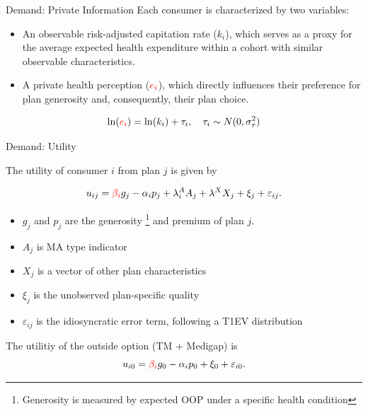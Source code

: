\documentclass[professionalfonts, aspectratio=169]{beamer}
\begin{document}
\begin{frame}{Demand: Private Information}
  Each consumer is characterized by two variables:
  \begin{itemize}
      \item An observable risk-adjusted capitation rate ($k_i$), which serves as a proxy for the average expected health expenditure within a cohort with similar observable characteristics.
      \item A private health perception ($\textcolor{red}{e_i}$), which directly influences their preference for plan generosity and, consequently, their plan choice.
  \end{itemize}

  \begin{equation}
    \ln(\textcolor{red}{e_i}) = \ln(k_i) + \tau_i, \quad \tau_i \sim N(0, \sigma_\tau^2)
  \end{equation}

\end{frame}

\begin{frame}{Demand: Utility}

  The utility of consumer $i$ from plan $j$ is given by

  \begin{equation}
    u_{ij} = \textcolor{red}{\beta_i} g_j - \alpha_i p_j + \lambda^{A}_i A_j + \lambda^X X_j + \xi_j + \varepsilon_{ij}.
  \end{equation}

  \begin{itemize}\small
    \item $g_j$ and $p_j$ are the generosity \footnote{Generosity is measured by expected OOP under a specific health condition} and premium of plan $j$.
    \item $A_j$ is MA type indicator
    \item $X_j$ is a vector of other plan characteristics
    \item $\xi_j$ is the unobserved plan-specific quality
    \item $\varepsilon_{ij}$ is the idiosyncratic error term, following a T1EV distribution
  \end{itemize}

  The utilitiy of the outside option (TM + Medigap) is
  \begin{equation}
    u_{i0} = \textcolor{red}{\beta_i} g_0 - \alpha_i p_0 + \xi_0 + \varepsilon_{i0}.
  \end{equation}
\end{frame}
\end{document}
